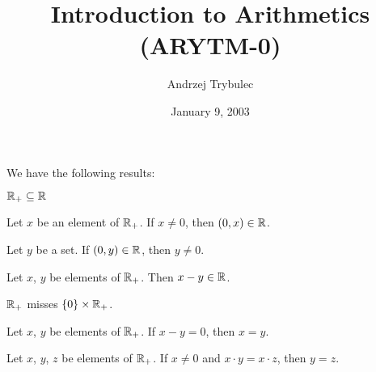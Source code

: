\documentclass{article}
\title{Introduction to Arithmetics (ARYTM-0)}
\author{Andrzej Trybulec}
\date{January 9, 2003}
\begin{document}
\maketitle

We have the following results:
\begin{thm}
\item\label{arytm0:1} $\mathbb{R}_{+}\subseteq\mathbb{R}$
\item\label{arytm0:2} Let $x$ be an element of $\mathbb{R}_{+}$. If $x\neq0$,
  then $(0,x)\in\mathbb{R}$.
\item\label{arytm0:3} Let $y$ be a set. If $(0,y)\in\mathbb{R}$, then $y\neq0$.
\item\label{arytm0:4} Let $x$, $y$ be elements of $\mathbb{R}_{+}$. Then $x-y\in\mathbb{R}$.
\item\label{arytm0:5} $\mathbb{R}_{+}$ misses $\{0\}\times\mathbb{R}_{+}$.
\item\label{arytm0:6} Let $x$, $y$ be elements of $\mathbb{R}_{+}$. If $x-y=0$,
  then $x=y$.
\item\label{arytm0:7} Let $x$, $y$, $z$ be elements of $\mathbb{R}_{+}$.
  If $x\neq0$ and $x\cdot y=x\cdot z$, then $y=z$.
\end{thm}
\end{document}
